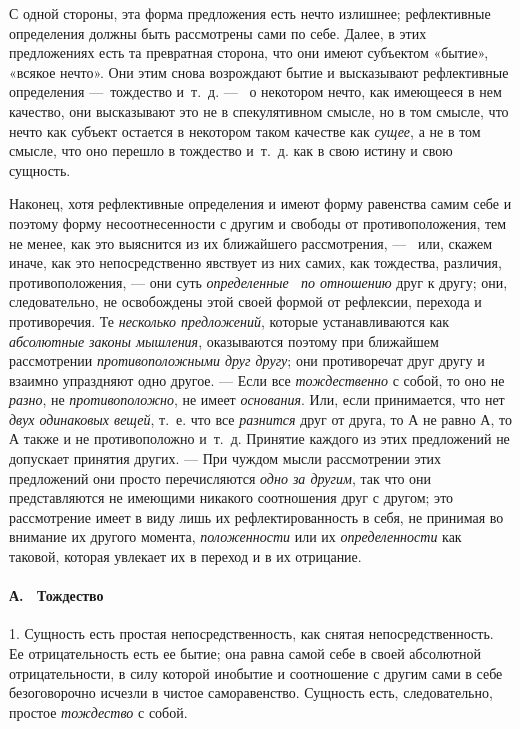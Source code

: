 С одной стороны, эта форма предложения есть нечто излишнее; рефлективные
определения должны быть рассмотрены сами по себе. Далее, в этих
предложениях есть та превратная сторона, что они имеют субъектом «бытие»,
«всякое нечто». Они этим снова возрождают бытие и высказывают рефлективные
определения —~тождество и~т.~д. — \ о некотором нечто, как имеющееся в нем
качество, они высказывают это не в спекулятивном смысле, но в том смысле,
что нечто как субъект остается в некотором таком качестве как
{\em сущее}, а не в том смысле, что оно перешло в
тождество и~т.~д. как в свою истину и свою сущность.

Наконец, хотя рефлективные определения и имеют форму равенства самим себе и
поэтому форму несоотнесенности с другим и свободы от противоположения, тем
не менее, как это выяснится из их ближайшего рассмотрения, — \ или, скажем
иначе, как это непосредственно явствует из них самих, как тождества,
различия, противоположения, — они суть
{\em определенные \ по отношению }друг к другу; они,
следовательно, не освобождены этой своей формой от рефлексии, перехода и
противоречия. Те {\em несколько предложений}, которые
устанавливаются как {\em абсолютные законы мышления},
оказываются поэтому при ближайшем рассмотрении
{\em противоположными друг другу}; они противоречат
друг другу и взаимно упраздняют одно другое. — Если все
{\em тождественно} с собой, то оно не
{\em разно}, не
{\em противоположно}, не имеет
{\em основания}. Или, если принимается, что нет
{\em двух одинаковых вещей}, т.~е. что все
{\em разнится} друг от друга, то $А$ не равно
$А$, то $А$ также и не противоположно и~т.~д. Принятие
каждого из этих предложений не допускает принятия других. — При чуждом
мысли рассмотрении этих предложений они просто перечисляются
{\em одно за другим}, так что они представляются не
имеющими никакого соотношения друг с другом; это рассмотрение имеет в виду
лишь их рефлектированность в себя, не принимая во внимание их другого
момента, {\em положенности} или их
{\em определенности} как таковой, которая увлекает их в
переход и в их отрицание.

\paragraph[А. \ Тождество]{А. \ Тождество}
1. Сущность есть простая непосредственность, как
снятая непосредственность. Ее отрицательность есть ее бытие; она равна
самой себе в своей абсолютной отрицательности, в силу которой инобытие и
соотношение с другим сами в себе безоговорочно исчезли в чистое
саморавенство. Сущность есть, следовательно, простое
{\em тождество} с собой.

